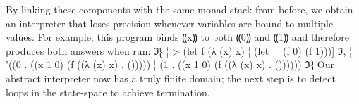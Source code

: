 By linking these components with the same monad stack from before, we obtain an
interpreter that loses precision whenever variables are bound to multiple
values.  For example, this program binds ⸨x⸩ to both ⸨0⸩ and ⸨1⸩ and therefore
produces both answers when run:
ℑ⁅
¦ > (let f (λ (x) x)
¦     (let _ (f 0) (f 1)))]
ℑ,
¦ '((0 . ((x 1 0) (f ((λ (x) x) . ()))))
¦   (1 . ((x 1 0) (f ((λ (x) x) . ())))))
ℑ⁆
Our abstract interpreter now has a truly finite domain; the next step is to
detect loops in the state-space to achieve termination.

